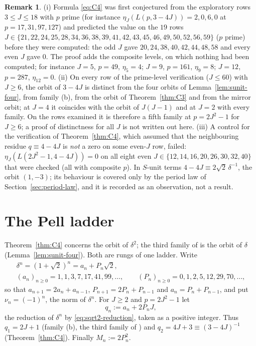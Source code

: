 \documentclass[11pt]{article}
\theoremstyle{definition}
\newtheorem{remark}[theorem]{Remark}
\begin{document}
\begin{remark}
\label{rem:C4-history}
(i) Formula \eqref{eq:C4} was first conjectured from the exploratory rows
$3\leq J\leq18$ with $p$ prime (for instance $\eta_J(L(p,3-4J))=2,0,6,0$
at $p=17,31,97,127$) and predicted the value on the $19$ rows
$J\in\{21,22,24,25,28,34,36,38,39,41,42,43,45,46,49,50,52,56,59\}$
($p$ prime) before they were computed: the odd $J$ gave
$20,24,38,40,42,44,48,58$ and every even $J$ gave $0$.  The proof adds
the composite levels, on which nothing had been computed; for instance
$J=5$, $p=49$, $\eta_5=4$; $J=9$, $p=161$, $\eta_9=8$; $J=12$, $p=287$,
$\eta_{12}=0$.
(ii) On every row of the prime-level verification ($J\leq60$) with
$J\geq6$, the orbit of $3-4J$ is distinct from the four orbits of
Lemma~\ref{lem:sunit-four}, from family (b), from the orbit of
Theorem~\ref{thm:C3} and from the mirror orbit; at $J=4$ it coincides
with the orbit of $J(J-1)$ and at $J=2$ with every family.  On the rows
examined it is therefore a fifth family at $p=2J^2-1$ for $J\geq6$; a
proof of distinctness for all $J$ is not written out here.
(iii) A control for the verification of Theorem~\ref{thm:C4}, which
assumed that the neighbouring residue $q\equiv4-4J$ is \emph{not} a zero
on some even-$J$ row, failed: $\eta_J(L(2J^2-1,4-4J))=0$ on all eight
even $J\in\{12,14,16,20,26,30,32,40\}$ that were checked (all with
composite $p$).  In $S$-unit terms $4-4J\equiv2\sqrt2\,\delta^{-1}$, the
orbit $(1,-3)$; its behaviour is covered only by the period law of
Section~\ref{sec:period-law}, and it is recorded as an observation, not
a result.
\end{remark}

\section{The Pell ladder}
\label{sec:pell}

Theorem~\ref{thm:C4} concerns the orbit of $\delta^2$; the third family
of \cite[Thm.~7.1]{MahmoodP1Collection2026} is the orbit of $\delta$
(Lemma~\ref{lem:sunit-four}).  Both are rungs of one ladder.  Write
\begin{equation}
 \begin{gathered}
 \delta^n=(1+\sqrt2)^n=a_n+P_n\sqrt2,\\
 (a_n)_{n\geq0}=1,1,3,7,17,41,99,\ldots,\qquad
 (P_n)_{n\geq0}=0,1,2,5,12,29,70,\ldots,
 \end{gathered}
 \label{eq:pell-numbers}
\end{equation}
so that $a_{n+1}=2a_n+a_{n-1}$, $P_{n+1}=2P_n+P_{n-1}$ and
$a_n=P_n+P_{n-1}$, and put $\nu_n=(-1)^n$, the norm of $\delta^n$.  For
$J\geq2$ and $p=2J^2-1$ let
\begin{equation}
 q_n:=a_n+2P_nJ ,
 \label{eq:qn}
\end{equation}
the reduction of $\delta^n$ by \eqref{eq:sqrt2-reduction}, taken as a
positive integer.  Thus $q_1=2J+1$ (family (b), the third family of
\cite[Thm.~7.1]{MahmoodP1Collection2026}) and
$q_2=4J+3\equiv(3-4J)^{-1}$ (Theorem~\ref{thm:C4}).  Finally
$M_n:=2P_n^2$.
\end{document}
